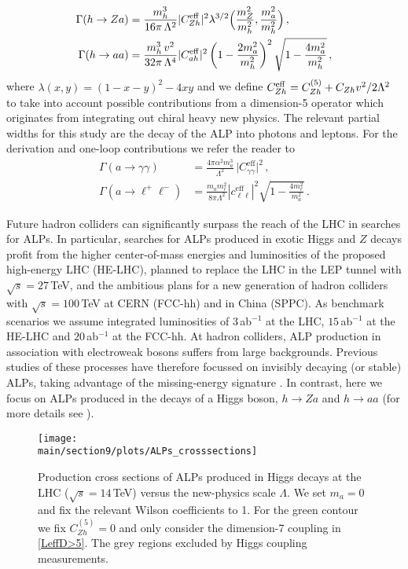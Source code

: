 \begin{align}
\Gamma(h \to Za)&=\frac{m_h^3}{16\pi\,\Lambda^2}|C_{Zh}^\text{eff}|^2\lambda^{3/2}\Big(\frac{m_Z^2}{m_h^2},\frac{m_a^2}{m_h^2}\Big)\,,\\
\Gamma(h \to aa)&=\frac{m_h^3\,v^2}{32\pi\,\Lambda^4}|C_{ah}^{\rm eff}|^2\left(1-\frac{2m_a^2}{m_h^2}\right)^2\sqrt{1-\frac{4m_a^2}{m_h^2}}\,,
\end{align}
%
where $\lambda(x,y)=(1-x-y)^2-4xy$ and we define $C_{Zh}^{\rm eff} = C_{Zh}^{(5)} + C_{Zh} v^2/2 \Lambda^2$ to take into account possible contributions from a dimension-5 operator which originates from integrating out chiral heavy new physics. The relevant partial widths for this study are the decay of the ALP into photons and leptons. For the derivation and one-loop contributions we refer the reader to \cite{Bauer:2017ris}
%
\begin{align}
 \Gamma(a\to\gamma\gamma)  &= \frac{4\pi\alpha^2 m_a^3}{\Lambda^2}\,\big| C_{\gamma\gamma}^\text{eff} \big|^2 \,, \\
 \Gamma(a\to \ell^+ \ell^-)&=\frac{m_a m_\ell^2}{8\pi\Lambda^2} \left| c_{\ell\ell}^\text{eff}\right|^2 \sqrt{1-\frac{4m_\ell^2}{m_a^2}}\,.
\end{align}
%


Future hadron colliders can significantly surpass the reach of the LHC in searches for ALPs. In particular, searches for ALPs produced in exotic Higgs and $Z$ decays profit from the higher center-of-mass energies and luminosities of the proposed high-energy LHC (HE-LHC), planned to replace the LHC in the LEP tunnel with $\sqrt{s}=27 \,$TeV, and the ambitious plans for a new generation of hadron colliders with $\sqrt{s}=100\,$TeV at CERN (FCC-hh) and in China (SPPC). As benchmark scenarios we assume integrated luminosities of $3$\,ab$^{-1}$ at the LHC, $15$\,ab$^{-1}$ at the HE-LHC and $20$\,ab$^{-1}$ at the FCC-hh.
At hadron colliders, ALP production in association with electroweak bosons suffers from large backgrounds. Previous studies of these processes have therefore focussed on invisibly decaying (or stable) ALPs, taking advantage of the missing-energy signature \cite{Mimasu:2014nea,Brivio:2017ije}. In contrast, here we focus on ALPs produced in the decays of a Higgs boson, $h\to Za$ and $h \to a a$ (for more details see \cite{Bauer:2018uxu}).


%
\begin{figure}
\begin{center}
 \texttt{[image: \\main/section9/plots/ALPs\_crosssections]}
    \end{center}
\caption{\label{fig:ALPpsec} Production cross sections of ALPs produced in Higgs decays at the LHC ($\sqrt{s} = 14\,$TeV) versus the new-physics scale $\Lambda$. We set $m_a=0$ and fix the relevant Wilson coefficients to 1. For the green contour we fix $C_{Zh}^{(5)}=0$ and only consider the dimension-7 coupling in \eqref{LeffD>5}.
The grey regions excluded by Higgs coupling measurements. }
\end{figure}
%

